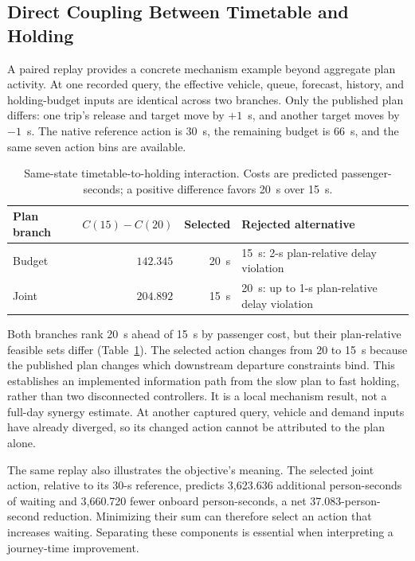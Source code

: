 \subsection{Direct Coupling Between Timetable and Holding}

A paired replay provides a concrete mechanism example beyond aggregate plan
activity. At one recorded query, the effective vehicle, queue, forecast,
history, and holding-budget inputs are identical across two branches. Only the
published plan differs: one trip's release and target move by $+1$~s, and
another target moves by $-1$~s. The native reference action is 30~s, the remaining
budget is 66~s, and the same seven action bins are available.

\begin{table}[t]
\centering
\caption{Same-state timetable-to-holding interaction. Costs are predicted
passenger-seconds; a positive difference favors 20~s over 15~s.}
\label{tab:coupling}
\setlength{\tabcolsep}{4pt}
\footnotesize
\begin{tabularx}{\columnwidth}{lrrX}
\toprule
Plan branch & $C(15)-C(20)$ & Selected & Rejected alternative \\
\midrule
Budget & $142.345$ & 20~s & 15~s: 2-s plan-relative delay violation \\
Joint & $204.892$ & 15~s & 20~s: up to 1-s plan-relative delay violation \\
\bottomrule
\end{tabularx}
\end{table}

Both branches rank 20~s ahead of 15~s by passenger cost, but their plan-relative
feasible sets differ (Table~\ref{tab:coupling}). The selected action changes
from 20 to 15~s because the published plan changes which downstream departure
constraints bind. This establishes an implemented information path from the
slow plan to fast holding, rather than two disconnected controllers. It is a
local mechanism result, not a full-day synergy estimate. At another captured
query, vehicle and demand inputs have already diverged, so its changed action
cannot be attributed to the plan alone.

The same replay also illustrates the objective's meaning. The selected joint
action, relative to its 30-s reference, predicts 3,623.636 additional
person-seconds of waiting and 3,660.720 fewer onboard person-seconds, a net
37.083-person-second reduction. Minimizing their sum can therefore select an
action that increases waiting. Separating these components is essential when
interpreting a journey-time improvement.
